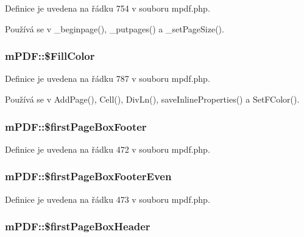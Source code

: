 Definice je uvedena na řádku 754 v souboru mpdf.\-php.



Používá se v \-\_\-beginpage(), \-\_\-putpages() a \-\_\-set\-Page\-Size().

\hypertarget{classm_p_d_f_ae84c947b6cd2d37e030737806870860c}{
\subsubsection[{\$\-Fill\-Color}]{\setlength{\rightskip}{0pt plus 5cm}m\-P\-D\-F\-::\$\-Fill\-Color}}\label{classm_p_d_f_ae84c947b6cd2d37e030737806870860c}


Definice je uvedena na řádku 787 v souboru mpdf.\-php.



Používá se v Add\-Page(), Cell(), Div\-Ln(), save\-Inline\-Properties() a Set\-F\-Color().

\hypertarget{classm_p_d_f_a65cd3ad70ccf3e0c403598eb5ed122c9}{
\subsubsection[{\$first\-Page\-Box\-Footer}]{\setlength{\rightskip}{0pt plus 5cm}m\-P\-D\-F\-::\$first\-Page\-Box\-Footer}}\label{classm_p_d_f_a65cd3ad70ccf3e0c403598eb5ed122c9}


Definice je uvedena na řádku 472 v souboru mpdf.\-php.

\hypertarget{classm_p_d_f_a051f5d9571ad301acdedb25895dce230}{
\subsubsection[{\$first\-Page\-Box\-Footer\-Even}]{\setlength{\rightskip}{0pt plus 5cm}m\-P\-D\-F\-::\$first\-Page\-Box\-Footer\-Even}}\label{classm_p_d_f_a051f5d9571ad301acdedb25895dce230}


Definice je uvedena na řádku 473 v souboru mpdf.\-php.

\hypertarget{classm_p_d_f_a84c448e0b64fb50a4ffa83105b03fad2}{
\subsubsection[{\$first\-Page\-Box\-Header}]{\setlength{\rightskip}{0pt plus 5cm}m\-P\-D\-F\-::\$first\-Page\-Box\-Header}}\label{classm_p_d_f_a84c448e0b64fb50a4ffa83105b03fad2}


